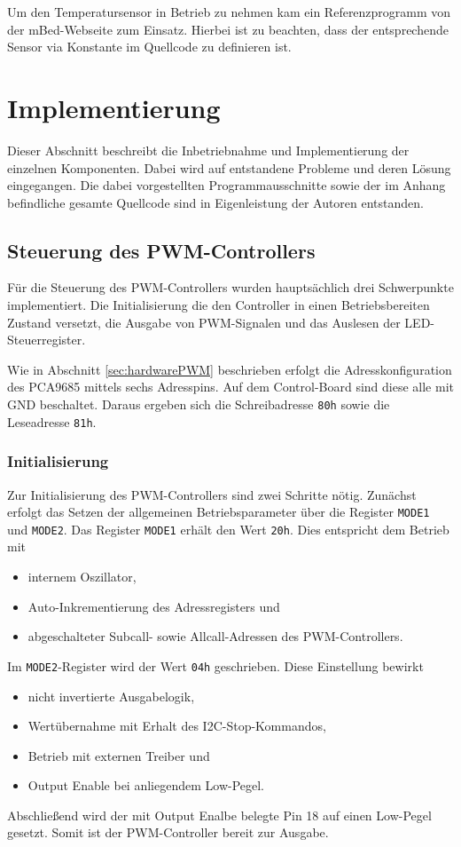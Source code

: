 \documentclass[a4paper,12pt]{scrartcl}
\begin{document}
Um den Temperatursensor in Betrieb zu nehmen kam ein Referenzprogramm von der mBed-Webseite \cite{progds1820} zum Einsatz. Hierbei ist zu beachten, dass der entsprechende Sensor via Konstante im Quellcode zu definieren ist.

\clearpage
\section{Implementierung}
Dieser Abschnitt beschreibt die Inbetriebnahme und Implementierung der einzelnen Komponenten. Dabei wird auf entstandene Probleme und deren Lösung eingegangen. Die dabei vorgestellten Programmausschnitte sowie der im Anhang befindliche gesamte Quellcode sind in Eigenleistung der Autoren entstanden.

\subsection{Steuerung des PWM-Controllers}
Für die Steuerung des PWM-Controllers wurden hauptsächlich drei Schwerpunkte implementiert. Die Initialisierung die den Controller in einen Betriebsbereiten Zustand versetzt, die Ausgabe von PWM-Signalen und das Auslesen der LED-Steuerregister.

Wie in Abschnitt \ref{sec:hardwarePWM} beschrieben erfolgt die Adresskonfiguration des PCA9685 mittels sechs Adresspins. Auf dem Control-Board sind diese alle mit GND beschaltet. Daraus ergeben sich die Schreibadresse \texttt{80h} sowie die Leseadresse \texttt{81h}.

\subsubsection{Initialisierung}
Zur Initialisierung des PWM-Controllers sind zwei Schritte nötig. Zunächst erfolgt das Setzen der allgemeinen Betriebsparameter über die Register \texttt{MODE1} und \texttt{MODE2}. Das Register \texttt{MODE1} erhält den Wert \texttt{20h}. Dies entspricht dem Betrieb mit 
\begin{itemize}
\item internem Oszillator,
\item Auto-Inkrementierung des Adressregisters und
\item abgeschalteter Subcall- sowie Allcall-Adressen des PWM-Controllers.
\end{itemize}
Im \texttt{MODE2}-Register wird der Wert \texttt{04h} geschrieben. Diese Einstellung bewirkt
\begin{itemize}
\item nicht invertierte Ausgabelogik,
\item Wertübernahme mit Erhalt des I2C-Stop-Kommandos,
\item Betrieb mit externen Treiber und
\item Output Enable bei anliegendem Low-Pegel.
\end{itemize}
Abschließend wird der mit Output Enalbe belegte Pin 18 auf einen Low-Pegel gesetzt. Somit ist der PWM-Controller bereit zur Ausgabe.
\end{document}
